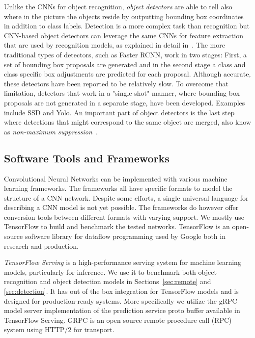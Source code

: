 \documentclass[sigconf]{acmart}
\begin{document}
Unlike the CNNs for object recognition, \textit{object detectors} are able to tell also where in the picture the objects reside by outputting bounding box coordinates in addition to class labels. Detection is a more complex task than recognition but CNN-based object detectors can leverage the same CNNs for feature extraction that are used by recognition models, as explained in detail in~\cite{Huang2017CVPR}. The more traditional types of detectors, such as Faster RCNN\cite{ren17frcnn}, work in two stages: First, a set of bounding box proposals are generated and in the second stage a class and class specific box adjustments are predicted for each proposal. Although accurate, these detectors have been reported to be relatively slow. To overcome that limitation, detectors that work in a "single shot" manner, where bounding box proposals are not generated in a separate stage, have been developed. Examples include SSD\cite{liu16ssd} and Yolo\cite{redmon16CVPR}. An important part of object detectors is the last step where detections that might correspond to the same object are merged, also know as \textit{non-maximum suppression}~\cite{HosangBS17}.

\subsection{Software Tools and Frameworks}

Convolutional Neural Networks can be implemented with various machine learning frameworks. The frameworks all have specific formats to model the structure of a CNN network. Despite some efforts, a single universal language for describing a CNN model is not yet possible. The frameworks do however offer conversion tools between different formats with varying support. We mostly use TensorFlow to build and benchmark the tested networks. TensorFlow is an open-source software library for dataflow programming used by Google both in research and production.

\textit{TensorFlow Serving} is a high-performance serving system for machine learning models, particularly for inference. We use it to benchmark both object recognition and object detection models in Sections~\ref{sec:remote} and \ref{sec:detection}. It has out of the box integration for TensorFlow models and is designed for production-ready systems. More specifically we utilize the gRPC model server implementation of the prediction service proto buffer available in TensorFlow Serving. GRPC is an open source remote procedure call (RPC) system using HTTP/2 for transport.
\end{document}
